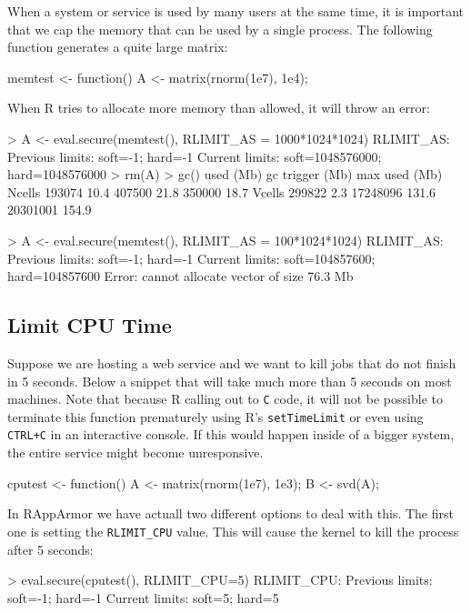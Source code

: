 \documentclass[article]{jss}
\begin{document}
\begin{appendices}
When a system or service is used by many users at the same time, it is important
that we cap the memory that can be used by a single process. The following
function generates a quite large matrix:

\begin{CodeChunk}
\begin{CodeInput}
memtest <- function(){
	A <- matrix(rnorm(1e7), 1e4);
}
\end{CodeInput}
\end{CodeChunk}

When R tries to allocate more memory than allowed, it will throw an error:

\begin{CodeChunk}
\begin{CodeInput}
> A <- eval.secure(memtest(), RLIMIT_AS = 1000*1024*1024)
RLIMIT_AS:
Previous limits: soft=-1; hard=-1
Current limits: soft=1048576000; hard=1048576000
> rm(A)
> gc()
         used (Mb) gc trigger  (Mb) max used  (Mb)
Ncells 193074 10.4     407500  21.8   350000  18.7
Vcells 299822  2.3   17248096 131.6 20301001 154.9


> A <- eval.secure(memtest(), RLIMIT_AS = 100*1024*1024)
RLIMIT_AS:
Previous limits: soft=-1; hard=-1
Current limits: soft=104857600; hard=104857600
Error: cannot allocate vector of size 76.3 Mb
\end{CodeInput}
\end{CodeChunk}


\subsection{Limit CPU Time}

Suppose we are hosting a web service and we want to kill jobs that do not finish
in 5 seconds. Below a snippet that will take much more than 5 seconds on most
machines. Note that because R calling out to \texttt{C} code, it will not be
possible to terminate this function prematurely using R's \texttt{setTimeLimit}
or even using \texttt{CTRL+C} in an interactive console. If this would happen
inside of a bigger system, the entire service might become unresponsive.

\begin{CodeChunk}
\begin{CodeInput}
cputest <- function(){
  A <- matrix(rnorm(1e7), 1e3);
  B <- svd(A);
}
\end{CodeInput}
\end{CodeChunk}
In RAppArmor we have actuall two different options to deal with this. The first
one is setting the \texttt{RLIMIT\_CPU} value. This will cause the kernel to
kill the process after 5 seconds: 
\begin{CodeChunk}
\begin{CodeInput}
> eval.secure(cputest(), RLIMIT_CPU=5)
RLIMIT_CPU:
Previous limits: soft=-1; hard=-1
Current limits: soft=5; hard=5


\end{CodeInput}
\end{CodeChunk}
\end{appendices}
\end{document}
